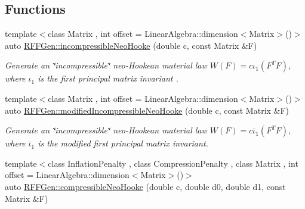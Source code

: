 \subsection*{Functions}
\begin{DoxyCompactItemize}
\item 
\hypertarget{group__Rubber_ga554b9bf515aa99d3bdc9e230f2a65bca}{{\footnotesize template$<$class Matrix , int offset = Linear\-Algebra\-::dimension$<$\-Matrix$>$()$>$ }\\auto \hyperlink{group__Rubber_ga554b9bf515aa99d3bdc9e230f2a65bca}{R\-F\-F\-Gen\-::incompressible\-Neo\-Hooke} (double c, const Matrix \&F)}\label{group__Rubber_ga554b9bf515aa99d3bdc9e230f2a65bca}

\begin{DoxyCompactList}\small\item\em Generate an \char`\"{}incompressible\char`\"{} neo-\/\-Hookean material law $ W(F)=c\iota_1(F^T F) $, where $\iota_1$ is the first principal matrix invariant . \end{DoxyCompactList}\item 
\hypertarget{group__Rubber_ga1b6f97c769ead09a5b1dcdf4733e85aa}{{\footnotesize template$<$class Matrix , int offset = Linear\-Algebra\-::dimension$<$\-Matrix$>$()$>$ }\\auto \hyperlink{group__Rubber_ga1b6f97c769ead09a5b1dcdf4733e85aa}{R\-F\-F\-Gen\-::modified\-Incompressible\-Neo\-Hooke} (double c, const Matrix \&F)}\label{group__Rubber_ga1b6f97c769ead09a5b1dcdf4733e85aa}

\begin{DoxyCompactList}\small\item\em Generate an \char`\"{}incompressible\char`\"{} neo-\/\-Hookean material law $ W(F)=c\bar\iota_1(F^T F) $, where $\bar\iota_1$ is the modified first principal matrix invariant. \end{DoxyCompactList}\item 
\hypertarget{group__Rubber_ga35a60a5ae50481becd543140ba82c171}{{\footnotesize template$<$class Inflation\-Penalty , class Compression\-Penalty , class Matrix , int offset = Linear\-Algebra\-::dimension$<$\-Matrix$>$()$>$ }\\auto \hyperlink{group__Rubber_ga35a60a5ae50481becd543140ba82c171}{R\-F\-F\-Gen\-::compressible\-Neo\-Hooke} (double c, double d0, double d1, const Matrix \&F)}\label{group__Rubber_ga35a60a5ae50481becd543140ba82c171}


\end{DoxyCompactItemize}
